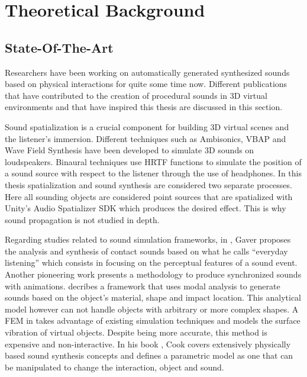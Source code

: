 \chapter{Theoretical Background}\label{ch:theory}

\section{State-Of-The-Art}\label{sec:state_art}





Researchers have been working on automatically generated synthesized sounds based on physical interactions for quite some time now. Different publications that have contributed to the creation of procedural sounds in 3D virtual environments and that have inspired this thesis are discussed in this section.

Sound spatialization is a crucial component for building 3D virtual scenes and the listener's immersion. Different techniques such as Ambisonics, \gls{VBAP} and Wave Field Synthesis have been developed to simulate 3D sounds on loudspeakers. Binaural techniques use \gls{HRTF} functions to simulate the position of a sound source with respect to the listener through the use of headphones. In this thesis spatialization and sound synthesis are considered two separate processes. Here all sounding objects are considered point sources that are spatialized with Unity\textsuperscript{\textregistered}'s Audio Spatializer \gls{SDK} \cite{bib:unity_doc} which produces the desired effect. This is why sound propagation is not studied in depth. 

Regarding studies related to sound simulation frameworks, in \cite{gaver1993we, gaver1993world}, Gaver proposes the analysis and synthesis of contact sounds based on what he calls ``everyday listening'' which consists in focusing on the perceptual features of a sound event. Another pioneering work \cite{takala1992sound} presents a methodology to produce synchronized sounds with animations. \cite{van1998sounds} decribes a framework that uses modal analysis to generate sounds based on the object's material, shape and impact location. This analytical model however can not handle objects with arbitrary or more complex shapes. A \gls{FEM} in \cite{director2001synthesizing} takes advantage of existing simulation techniques and models the surface vibration of virtual objects. Despite being more accurate, this method is expensive and non-interactive. In his book \cite{Cook:2002:RSS:515316}, Cook covers extensively physically based sound synthesis concepts and defines a parametric model as one that can be manipulated to change the interaction, object and sound.  

